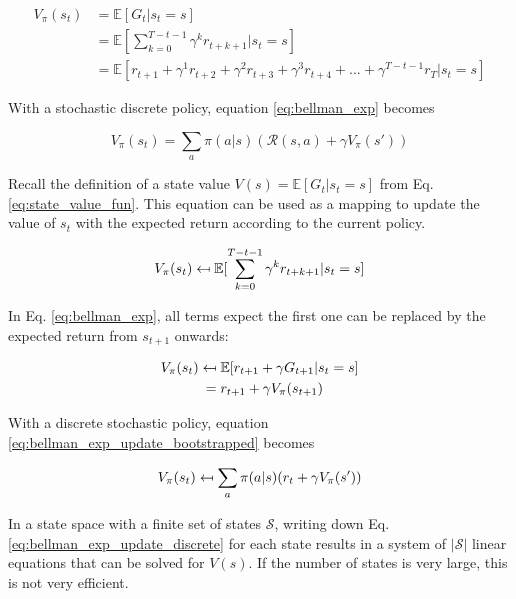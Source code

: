 \begin{align}
V_\pi(s_t)&=\mathbb{E}[G_t|s_t=s]\\ &= \mathbb{E}\left[ \sum_{k=0}^{T-t-1}\gamma^k r_{t+k+1}|s_t=s\right] \\
&=\mathbb{E}[r_{t+1}+\gamma^1 r_{t+2}+\gamma^2 r_{t+3}+\gamma^3 r_{t+4}+...+\gamma^{T-t-1}r_T|s_t=s]
\label{eq:bellman_exp}
\end{align}

With a stochastic discrete policy, equation \ref{eq:bellman_exp} becomes

\begin{equation}
V_\pi(s_t)=\sum_{a}\pi(a|s)(\mathcal{R}(s,a)+\gamma V_\pi(s'))
\label{eq:bellman_exp_discrete_policy}
\end{equation}

Recall the definition of a state value $V(s) = \mathbb{E}[G_t|s_t=s]$ from Eq. \ref{eq:state_value_fun}. This equation can be used as a mapping to update the value of $s_t$ with the expected return according to the current policy.

\begin{equation}
V_\pi(s_t) \mathrel{\reflectbox{\ensuremath{\mapsto}}} \mathbb{E}[ \sum_{k=0}^{T-t-1}\gamma^k r_{t+k+1}|s_t=s]
\label{eq:bellman_exp_update}
\end{equation}

In Eq. \ref{eq:bellman_exp}, all terms expect the first one can be replaced by the expected return from $s_{t+1}$ onwards:

\begin{align}
V_\pi(s_t) \mathrel{\reflectbox{\ensuremath{\mapsto}}} 
&\;\mathbb{E}[r_{t+1}+\gamma G_{t+1}|s_t=s]\\
=&\;r_{t+1}+\gamma V_\pi(s_{t+1})
\label{eq:bellman_exp_update_bootstrapped}
\end{align}

With a discrete stochastic policy, equation \ref{eq:bellman_exp_update_bootstrapped} becomes


\begin{equation}
V_{\pi}(s_t) \mathrel{\reflectbox{\ensuremath{\mapsto}}} \sum_{a}\pi(a|s)(r_t+\gamma V_\pi(s'))
\label{eq:bellman_exp_update_discrete}
\end{equation}

In a state space with a finite set of states $\mathcal{S}$, writing down Eq. \ref{eq:bellman_exp_update_discrete} for each state results in a system of $|\mathcal{S}|$ linear equations that can be solved for $V(s)$. If the number of states is very large, this is not very efficient. 

